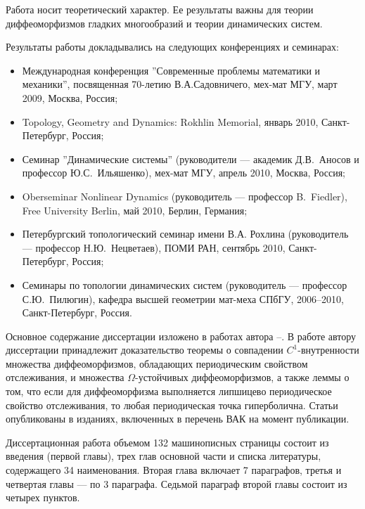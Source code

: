 \documentclass[12pt]{article}
\begin{document}
{ Работа носит тео\-ре\-тический характер. Ее результаты важны для теории диффеоморфизмов гладких многообразий и теории ди\-на\-ми\-ческих систем. %

 Результаты работы док\-ла\-ды\-ва\-лись на следующих конференциях и семинарах:

\begin{itemize}
	\item[--] Международная конференция ''Современные проблемы математики и механики'', посвященная 70-летию В.А.Садовничего, мех-мат МГУ, март 2009, Москва, Россия;
	\item[--] Topology, Geometry and Dynamics: Rokhlin Memorial, январь 2010, Санкт-Петербург, Россия;
	\item[--] Семинар ''Динамические системы'' (руководители --- академик Д.В.~Аносов и профессор Ю.С.~Ильяшенко), мех-мат МГУ, апрель 2010, Москва, Россия;
	\item[--] Oberseminar Nonlinear Dynamics (руководитель --- профессор B.~Fiedler), Free University Berlin, май 2010, Берлин, Германия;
	\item[--] Петербургский топологический семинар имени В.А. Рохлина (руководитель --- профессор Н.Ю.~Нецветаев), ПОМИ РАН, сентябрь 2010, Санкт-Петербург, Россия;
	\item[--] Семинары по топологии динамических систем (руководитель --- профессор С.Ю.~Пилюгин), кафедра высшей геометрии мат-меха СПбГУ, 2006--2010, Санкт-Петербург, Россия. 
\end{itemize}

Основное содержание диссертации изложено в работах автора \cite{O2}--\cite{O4}. В работе \cite{O4} автору диссертации принадлежит доказательство теоремы о совпадении $C^1$-внутренности множества диффеоморфизмов, обладающих периодическим свойством отслеживания, и множества $\Omega$-устойчивых диф\-фео\-морфизмов, а также леммы о том, что если для диффеоморфизма вы\-пол\-няется липшицево периодическое свойство отслеживания, то лю\-бая периодическая точка гиперболична. %
Статьи \cite{O2,O4} опубликованы в изданиях, включенных в перечень ВАК на момент публикации.

 Диссертационная работа объемом 132 машинописных страницы состоит из введения (первой главы), трех глав основной части и списка литературы, содержащего 34 наименования. Вторая глава включает 7 параграфов, третья и четвертая главы --- по 3 параграфа. Седьмой параграф второй главы состоит из четырех пунктов.

}
\end{document}
